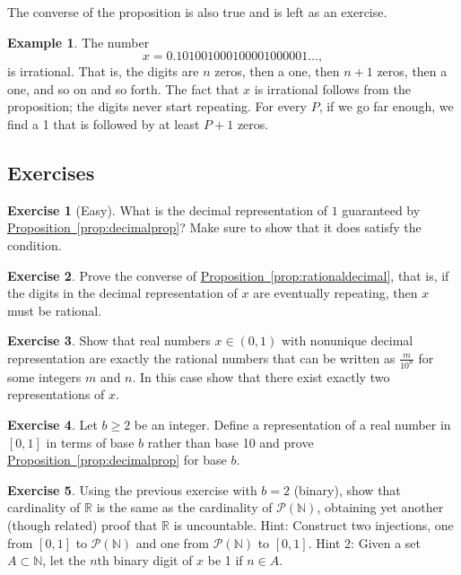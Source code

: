 \documentclass[12pt]{book}
\newcommand{\R}{{\mathbb{R}}}
\newcommand{\N}{{\mathbb{N}}}
\newcommand{\sP}{{\mathcal{P}}}
\theoremstyle{plain}
\theoremstyle{remark}
\theoremstyle{definition}
\theoremstyle{exercise}
\newtheorem{exercise}{Exercise}[section]
\theoremstyle{example}
\newtheorem{example}[thm]{Example}
\newcommand{\propref}[1]{\hyperref[#1]{Proposition~\ref*{#1}}}
\begin{document}
The converse of the proposition is also true and is left as an exercise.

\begin{example}
The number
\begin{equation*}
x = 0.101001000100001000001\ldots,
\end{equation*}
is irrational.  That is, the digits are $n$ zeros, then a one, then $n+1$
zeros, then a one, and so on and so forth.  The fact that $x$ is irrational follows from the
proposition; the digits never start repeating.  For every $P$,
if we go far enough, we find a 1 that is followed by at least $P+1$ zeros.
\end{example}

\subsection{Exercises}

\begin{exercise}[Easy]
What is the decimal representation of $1$ guaranteed by
\propref{prop:decimalprop}?  Make sure to show that it does satisfy
the condition.
\end{exercise}

\begin{exercise}
Prove the converse of \propref{prop:rationaldecimal}, that is,
if the digits in the decimal representation of $x$ are eventually repeating, then 
$x$ must be rational.
\end{exercise}

\begin{exercise} \label{exercise:nonuniquedecimals}
Show that real numbers $x \in (0,1)$ with nonunique decimal representation
are exactly the rational numbers that can be written
as $\frac{m}{10^n}$ for some integers $m$ and $n$.  In this case show that
there exist exactly two representations of $x$.
\end{exercise}

\begin{exercise}
Let $b \geq 2$ be an integer.  Define a representation of a real number in
$[0,1]$ in terms of base $b$ rather than base 10 and prove
\propref{prop:decimalprop} for base $b$.
\end{exercise}

\begin{exercise}
Using the previous exercise with $b=2$ (binary), 
show that cardinality of $\R$ is the same as the cardinality of $\sP(\N)$,
obtaining yet another (though related) proof that $\R$ is uncountable.
Hint: Construct two injections, one from $[0,1]$ to $\sP(\N)$
and one from $\sP(\N)$ to $[0,1]$.  Hint 2: Given a
set $A \subset \N$, let the $n$th binary digit of $x$ be 1 if $n\in A$.
\end{exercise}
\end{document}
